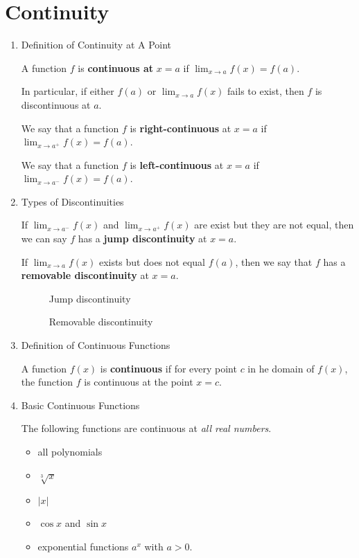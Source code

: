 \section{Continuity}
\begin{enumerate}
    \item Definition of Continuity at A Point

        A function $f$ is \textbf{continuous at} $x=a$ if $\lim_{x\to a} f(x)=f(a)$.

        In particular, if either $f(a)$ or $\lim_{x\to a} f(x)$ fails to exist, then $f$ is discontinuous at $a$.

        We say that a function $f$ is \textbf{right-continuous} at $x=a$ if $\lim_{x\to a^+} f(x)=f(a)$.

        We say that a function $f$ is \textbf{left-continuous} at $x=a$ if $\lim_{x\to a^-} f(x)=f(a)$.
    \item Types of Discontinuities

        If $\lim_{x\to a^-} f(x)$ and $\lim_{x\to a^+} f(x)$ are exist but they are not equal, then we can say $f$ has a \textbf{jump discontinuity} at $x=a$.

        If $\lim_{x\to a} f(x)$ exists but does not equal $f(a)$, then we say that $f$ has a \textbf{removable discontinuity} at $x=a$.
        \begin{figure}[H]
            \centering
            \caption{Jump discontinuity}
        \end{figure}
		\begin{figure}[H]
			\centering
			\caption{Removable discontinuity}
		\end{figure}
   \item Definition of Continuous Functions

       A function $f(x)$ is \textbf{continuous} if for every point $c$ in he domain of $f(x)$, the function $f$ is continuous at the point $x=c$.
    \item Basic Continuous Functions

        The following functions are continuous at \textit{all real numbers}.
        \begin{itemize}
            \item all polynomials
            \item $\sqrt[3]{x}$ 
            \item $|x|$
            \item $\cos x$ and $\sin x$
            \item exponential functions $a^x$ with $a>0$.
        \end{itemize}


\end{enumerate}
